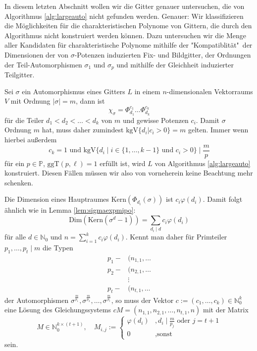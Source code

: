 \documentclass[12pt,a4paper,halfparskip,headsepline,bibtotocnumbered]{scrreprt}
\theoremstyle{nummermitklammern}
\theoremstyle{nonumberbreak}
\newcommand{\N}{\mathbb{N}}
\renewcommand{\P}{\mathbb{P}}
\newcommand{\Kern}{\text{Kern}}
\newcommand{\ggT}{\text{ggT}}
\newcommand{\kgV}{\text{kgV}}
\newcommand{\Dim}{\text{Dim}}
\begin{document}
In diesem letzten Abschnitt wollen wir die Gitter genauer untersuchen, die von Algorithmus \eqref{alg:largeauto} nicht gefunden werden. Genauer: Wir klassifizieren die Möglichkeiten für die charakteristischen Polynome von Gittern, die durch den Algorithmus nicht konstruiert werden können. Dazu untersuchen wir die Menge aller Kandidaten für charakteristische Polynome mithilfe der "Kompatiblität"\ der Dimensionen der von $\sigma$-Potenzen induzierten Fix- und Bildgitter, der Ordnungen der Teil-Automorphismen $\sigma_1$ und $\sigma_p$ und mithilfe der Gleichheit induzierter Teilgitter.\par
Sei $\sigma$ ein Automorphismus eines Gitters $L$ in einem $n$-dimensionalen Vektorraums $V$ mit Ordnung $\vert \sigma \vert = m$, dann ist
	\[\chi_\sigma = \Phi_{d_1}^{c_1} \dots \Phi_{d_k}^{c_k} \]
für die Teiler $d_1 < d_2 < \dots < d_k$ von $m$ und gewisse Potenzen $c_i$. Damit $\sigma$ Ordnung $m$ hat, muss daher zumindest $\kgV\lbrace d_i \vert c_i > 0 \rbrace = m$ gelten. Immer wenn hierbei außerdem
\[c_k = 1 \text{ und } \kgV \lbrace d_i \mid i \in \lbrace 1, \dots, k-1 \rbrace \text{ und } c_i > 0 \rbrace \mid \frac{m}{p}\]
für ein $p \in \P$, $\ggT(p, \ell) = 1$ erfüllt ist, wird $L$ von Algorithmus \eqref{alg:largeauto} konstruiert. Diesen Fällen müssen wir also von vorneherein keine Beachtung mehr schenken.\par
Die Dimension eines Hauptraumes $\Kern(\Phi_{d_i}(\sigma))$ ist $c_i \varphi(d_i)$. Damit folgt ähnlich wie in Lemma \eqref{lem:sigmaexpmipo}:
	\[ \Dim(\Kern(\sigma^d-1)) = \sum_{d_i \mid d} c_i \varphi(d_i) \]
für alle $d \in \N_0$ und $n = \sum_{i=1}^k c_i \varphi(d_i)$. Kennt man daher für Primteiler $p_1, \dots, p_t \mid m$ die Typen
\begin{align*}
	p_1 - &(n_{1,1}, \dots\\
	p_2 - &(n_{2,1}, \dots\\
	&\vdots\\
	p_t - &(n_{t,1}, \dots
\end{align*}
der Automorphismen $\sigma^\frac{m}{p_1}, \sigma^\frac{m}{p_2}, \dots, \sigma^\frac{m}{p_t}$, so muss der Vektor $c := (c_1, \dots, c_k) \in \N_0^k$ eine Lösung des Gleichungssystems $c M= (n_{1,1}, n_{2,1}, \dots, n_{t,1}, n)$ mit der Matrix
	\[M \in \N_0^{k \times (t+1)}, \quad M_{i,j} := \begin{cases} \varphi(d_i)	&, d_i \mid \frac{m}{p_j} \text{ oder } j = t+1\\ 0 &, \text{sonst}\end{cases}\]
sein.\par
\end{document}
